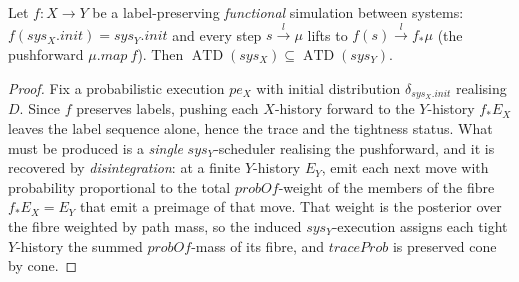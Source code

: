 \begin{lemma}
  \label{lem:map}
  \leanok
  Let $f : X \to Y$ be a label-preserving \emph{functional} simulation between systems: $f(sys_X.init) = sys_Y.init$ and every step $s \xrightarrow{l} \mu$ lifts to $f(s) \xrightarrow{l} f_\ast\mu$ (the pushforward $\mu.map\ f$).
  Then $\operatorname{ATD}(sys_X) \subseteq \operatorname{ATD}(sys_Y)$.
\end{lemma}

\begin{proof}\leanok
  Fix a probabilistic execution $pe_X$ with initial distribution $\delta_{sys_X.init}$ realising $D$. Since $f$ preserves labels, pushing each $X$-history forward to the $Y$-history $f_\ast E_X$ leaves the label sequence alone, hence the trace and the tightness status.
  What must be produced is a \emph{single} $sys_Y$-scheduler realising the pushforward, and it is recovered by \emph{disintegration}: at a finite $Y$-history $E_Y$, emit each next move with probability proportional to the total $probOf$-weight of the members of the fibre $f_\ast E_X = E_Y$ that emit a preimage of that move.
  That weight is the posterior over the fibre weighted by path mass, so the induced $sys_Y$-execution assigns each tight $Y$-history the summed $probOf$-mass of its fibre, and $traceProb$ is preserved cone by cone.
\end{proof}
